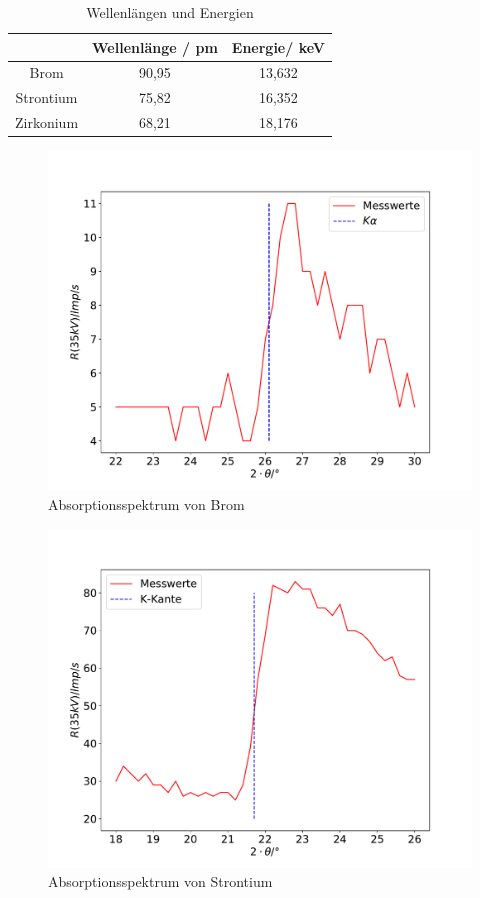 \begin{table}
  \centering
  \caption{Wellenlängen und Energien}
  \label{tab:alamde}
  \begin{tabular}{c c c}
    \toprule {} & {Wellenlänge / pm} & {Energie/ keV}\\
    \midrule
Brom      & 90,95 & 13,632 \\
Strontium & 75,82 & 16,352 \\
Zirkonium & 68,21 & 18,176 \\
\bottomrule
\end{tabular}
\end{table}

\begin{figure}
  \centering
  \includegraphics[width=\textwidth]{brom.pdf}
  \caption{Absorptionsspektrum von Brom}
  \label{fig:brom}
\end{figure}
\begin{figure}
  \centering
  \includegraphics[width=\textwidth]{strontium.pdf}
  \caption{Absorptionsspektrum von Strontium}
  \label{fig:strontium}
\end{figure}
